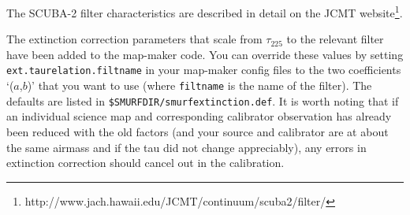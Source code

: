 \documentclass[twoside,11pt]{article}
\newcommand{\htmladdnormallinkfoot}[2]{#1\footnote{#2}}
\renewcommand{\_}{\texttt{\symbol{95}}}
\newcommand{\param}[1]{\texttt{#1}}
\begin{document}
The SCUBA-2 filter characteristics are described in
detail \htmladdnormallinkfoot{on the JCMT
website}{http://www.jach.hawaii.edu/JCMT/continuum/scuba2/filter/}.

The extinction correction parameters that scale from $\tau_{225}$ to
the relevant filter have been added to the map-maker code. You can
override these values by setting \param{ext.taurelation.filtname} in
your map-maker config files to the two coefficients `($a$,$b$)' that you
want to use (where \texttt{filtname} is the name of the filter). The
defaults are listed in \texttt{\$SMURF\_DIR/smurf\_extinction.def}.
It is worth noting that if an
individual science map and corresponding calibrator observation has
already been reduced with the old factors (and your source and
calibrator are at about the same airmass and if the tau did not change
appreciably), any errors in extinction correction should cancel out in
the calibration.

\clearpage
\end{document}
